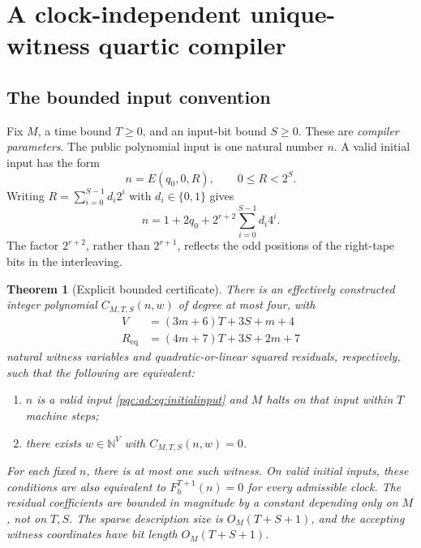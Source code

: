 \documentclass[11pt,letterpaper]{article}
\numberwithin{equation}{section}
\newtheorem{theorem}{Theorem}[section]
\theoremstyle{definition}
\theoremstyle{remark}
\newcommand{\N}{\mathbb N}
\newcommand{\Bit}{\{0,1\}}
\newcommand{\srcmark}[1]{\par\noindent{\small\itshape [source~#1]}\par}
\begin{document}
\section{A clock-independent unique-witness quartic compiler}\label{pqc:ad:sec:bounded}
\srcmark{12}

\subsection{The bounded input convention}
Fix $M$, a time bound $T\ge0$, and an input-bit bound $S\ge0$. These are
\emph{compiler parameters}. The public polynomial input is one natural
number $n$. A valid initial input has the form
\begin{equation}\label{pqc:ad:eq:initialinput}
n=E(q_0,0,R),\qquad 0\le R<2^S.
\end{equation}
Writing $R=\sum_{i=0}^{S-1}d_i2^i$ with $d_i\in\Bit$ gives
\begin{equation}\label{pqc:ad:eq:packedinput}
n=1+2q_0+2^{r+2}\sum_{i=0}^{S-1}d_i4^i.
\end{equation}
The factor $2^{r+2}$, rather than $2^{r+1}$, reflects the odd positions of
the right-tape bits in the interleaving.

\begin{theorem}[Explicit bounded certificate]\label{pqc:ad:thm:bounded}
There is an effectively constructed integer polynomial
$C_{M,T,S}(n,w)$ of degree at most four, with
\begin{align}
V&=(3m+6)T+3S+m+4 \label{pqc:ad:eq:V}\\
R_{\mathrm{eq}}&=(4m+7)T+3S+2m+7 \label{pqc:ad:eq:Req}
%
\end{align}
natural witness variables and quadratic-or-linear squared residuals,
respectively, such that the following are equivalent:
\begin{enumerate}[label=(\roman*),nosep]
\item $n$ is a valid input \eqref{pqc:ad:eq:initialinput} and $M$ halts on that
input within $T$ machine steps;
\item there exists $w\in\N^V$ with $C_{M,T,S}(n,w)=0$.
\end{enumerate}
For each fixed $n$, there is at most one such witness. On valid initial
inputs, these conditions are also equivalent to
$F_h^{T+1}(n)=0$ for every admissible clock. The residual coefficients are
bounded in magnitude by a constant depending only on $M$, not on $T,S$.
The sparse description size is $O_M(T+S+1)$, and the accepting witness
coordinates have bit length $O_M(T+S+1)$.
\end{theorem}
\end{document}
